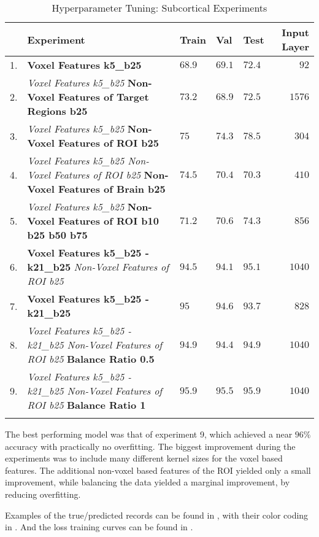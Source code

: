 \begin{longtable}[H]{|r|p{9cm}|l|l|l|r|}
\hline
 & \textbf{Experiment} & \textbf{Train} & \textbf{Val} & \textbf{Test} & \textbf{Input Layer} \\ \hline
1. & \textbf{Voxel Features k5\_b25} & $68.9$ & $69.1$ & $72.4$ & $92$  \\ \hline
2. & \emph{Voxel Features k5\_b25} \newline \textbf{Non-Voxel Features of Target Regions b25} & $73.2$ & $68.9$ & $72.5$ & $1576$ \\ \hline
3. & \emph{Voxel Features k5\_b25} \newline \textbf{Non-Voxel Features of ROI b25} & $75$ & $74.3$ & $78.5$ & $304$ \\ \hline
4. & \emph{Voxel Features k5\_b25 \newline Non-Voxel Features of ROI b25} \newline \textbf{Non-Voxel Features of Brain b25} & $74.5$ & $70.4$ & $70.3$ & $410$ \\ \hline
5. & \emph{Voxel Features k5\_b25} \newline \textbf{Non-Voxel Features of ROI b10 b25 b50 b75} & $71.2$ & $70.6$ & $74.3$ & $856$ \\ \hline
6. & \textbf{Voxel Features k5\_b25 - k21\_b25} \newline \emph{Non-Voxel Features of ROI b25} & $94.5$ & $94.1$ & $95.1$ & $1040$ \\ \hline
7. & \textbf{Voxel Features k5\_b25 - k21\_b25} & $95$ & $94.6$ & $93.7$ & $828$ \\ \hline
8. & \emph{Voxel Features k5\_b25 - k21\_b25 \newline Non-Voxel Features of ROI b25} \newline \textbf{Balance Ratio 0.5} & $94.9$ & $94.4$ & $94.9$ & $1040$ \\ \hline
9. & \emph{Voxel Features k5\_b25 - k21\_b25 \newline Non-Voxel Features of ROI b25} \newline \textbf{Balance Ratio 1} & $95.9$ & $95.5$ & $95.9$ & $1040$ \\ \hline
\caption{Hyperparameter Tuning: Subcortical Experiments}
\label{tab:expsub}
\end{longtable}

The best performing model was that of experiment 9, which achieved a near $96\%$ accuracy with practically no overfitting. The biggest improvement during the experiments was to include many different kernel sizes for the voxel based features. The additional non-voxel based features of the \ac{ROI} yielded only a small improvement, while balancing the data yielded a marginal improvement, by reducing overfitting.\par
Examples of the true/predicted records can be found in  , with their color coding in . And the loss training curves can be found in .

